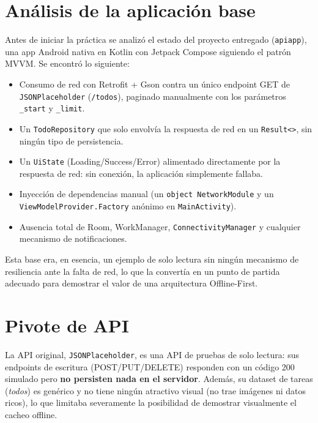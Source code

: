 \documentclass{article}
\begin{document}
	\section{Análisis de la aplicación base}
	Antes de iniciar la práctica se analizó el estado del proyecto entregado (\texttt{apiapp}), una app Android nativa en Kotlin con Jetpack Compose siguiendo el patrón MVVM. Se encontró lo siguiente:
	\begin{itemize}
		\item Consumo de red con Retrofit + Gson contra un único endpoint GET de \texttt{JSONPlaceholder} (\texttt{/todos}), paginado manualmente con los parámetros \texttt{\_start} y \texttt{\_limit}.
		\item Un \texttt{TodoRepository} que solo envolvía la respuesta de red en un \texttt{Result<>}, sin ningún tipo de persistencia.
		\item Un \texttt{UiState} (Loading/Success/Error) alimentado directamente por la respuesta de red: sin conexión, la aplicación simplemente fallaba.
		\item Inyección de dependencias manual (un \texttt{object NetworkModule} y un \texttt{ViewModelProvider.Factory} anónimo en \texttt{MainActivity}).
		\item Ausencia total de Room, WorkManager, \texttt{ConnectivityManager} y cualquier mecanismo de notificaciones.
	\end{itemize}
	Esta base era, en esencia, un ejemplo de solo lectura sin ningún mecanismo de resiliencia ante la falta de red, lo que la convertía en un punto de partida adecuado para demostrar el valor de una arquitectura Offline-First.

	\section{Pivote de API}
	La API original, \texttt{JSONPlaceholder}, es una API de pruebas de solo lectura: sus endpoints de escritura (POST/PUT/DELETE) responden con un código 200 simulado pero \textbf{no persisten nada en el servidor}. Además, su dataset de tareas (\textit{todos}) es genérico y no tiene ningún atractivo visual (no trae imágenes ni datos ricos), lo que limitaba severamente la posibilidad de demostrar visualmente el cacheo offline.
\end{document}
